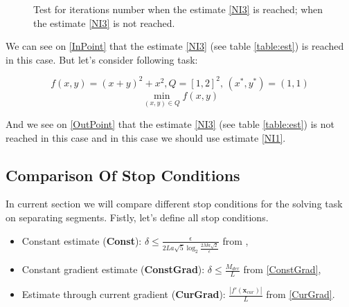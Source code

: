 \documentclass[12pt]{article}
\begin{document}
\begin{figure}[ht!]  
\vspace{-4ex} \centering {}  
\hspace{1.2ex}
\caption{Test for iterations number   when the estimate \ref{NI3} is reached;  when the estimate \ref{NI3} is not reached.} \label{fig:threeDMcases}
\end{figure}



We can see on \ref{InPoint} that the estimate \ref{NI3} (see table \ref{table:est}) is reached in this case. But let's consider following task:

$$f(x,y) = (x+y)^2+x^2, Q = [1,2]^2,\,(x^*, y^*) = (1,1)$$
$$\min\limits_{(x,y)\in Q}f(x,y)$$

And we see on \ref{OutPoint} that the estimate \ref{NI3} (see table \ref{table:est}) is not reached in this case and in this case we should use estimate \ref{NI1}.

\subsection{Comparison Of Stop Conditions}

In current section we will compare different stop conditions for the solving task on separating segments. Fistly, let's define all stop conditions.

\begin{itemize}
	\item Constant estimate (\textbf{Const}): $\delta \leq \frac{\epsilon}{2La\sqrt{5}\log_2\frac{2Ma\sqrt{2}}{\epsilon}}$ from \cite{Ston_Pas},
	\item Constant gradient estimate (\textbf{ConstGrad}): $\delta \leq \frac{M_{der}}{L}$ from \ref{ConstGrad},
	\item Estimate through current gradient (\textbf{CurGrad}): $\frac{|f'(\textbf{x}_{cur})|}{L}$ from \ref{CurGrad}.
\end{itemize}
\end{document}
